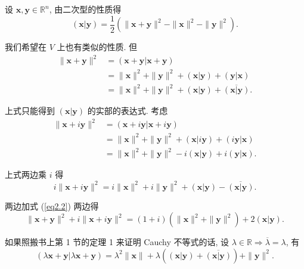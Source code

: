 \documentclass[color=black,device=normal,lang=cn,mode=geye]{elegantnote}
\begin{document}
设 $\boldsymbol{x},\boldsymbol{y}\in\mathbb{R}^n$, 由二次型的性质得
\[(\boldsymbol{x}|\boldsymbol{y})=\dfrac{1}{2}(\|\boldsymbol{x}+\boldsymbol{y}\|^2-\|\boldsymbol{x}\|^2-\|\boldsymbol{y}\|^2).\]

我们希望在 $V$ 上也有类似的性质. 但
\begin{equation}\label{eq2.2}
    \begin{aligned}
        \|\boldsymbol{x}+\boldsymbol{y}\|^2 & =(\boldsymbol{x}+\boldsymbol{y}|\boldsymbol{x}+\boldsymbol{y}) \\
        & =\|\boldsymbol{x}\|^2+\|\boldsymbol{y}\|^2+(\boldsymbol{x}|\boldsymbol{y})+(\boldsymbol{y}|\boldsymbol{x}) \\
        & =\|\boldsymbol{x}\|^2+\|\boldsymbol{y}\|^2+(\boldsymbol{x}|\boldsymbol{y})+\overline{(\boldsymbol{x}|\boldsymbol{y})}. 
    \end{aligned}
\end{equation}

上式只能得到 $(\boldsymbol{x}|\boldsymbol{y})$ 的实部的表达式. 考虑
\begin{align*}
    \|\boldsymbol{x}+i\boldsymbol{y}\|^2 & =(\boldsymbol{x}+i\boldsymbol{y}|\boldsymbol{x}+i\boldsymbol{y}) \\
    & =\|\boldsymbol{x}\|^2+\|\boldsymbol{y}\|^2+(\boldsymbol{x}|i\boldsymbol{y})+(i\boldsymbol{y}|\boldsymbol{x}) \\
    & =\|\boldsymbol{x}\|^2+\|\boldsymbol{y}\|^2-i(\boldsymbol{x}|\boldsymbol{y})+i(\boldsymbol{y}|\boldsymbol{x}).
\end{align*}

上式两边乘 $i$ 得
\[i\|\boldsymbol{x}+i\boldsymbol{y}\|^2=i\|\boldsymbol{x}\|^2+i\|\boldsymbol{y}\|^2+(\boldsymbol{x}|\boldsymbol{y})-\overline{(\boldsymbol{x}|\boldsymbol{y})}.\]

两边加式 (\ref{eq2.2}) 两边得
\begin{equation}\label{eq2.3}
    \|\boldsymbol{x}+\boldsymbol{y}\|^2+i\|\boldsymbol{x}+i\boldsymbol{y}\|^2=(1+i)(\|\boldsymbol{x}\|^2+\|\boldsymbol{y}\|^2)+2(\boldsymbol{x}|\boldsymbol{y}).
\end{equation}

如果照搬书上第 1 节的定理 1 来证明 Cauchy 不等式的话, 设 $\lambda\in\mathbb{R}\Rightarrow\overline{\lambda}=\lambda$, 有
\[(\lambda\boldsymbol{x}+\boldsymbol{y}|\lambda\boldsymbol{x}+\boldsymbol{y})=\lambda^2\|\boldsymbol{x}\|+\lambda((\boldsymbol{x}|\boldsymbol{y})+\overline{(\boldsymbol{x}|\boldsymbol{y})})+\|\boldsymbol{y}\|^2.\]
\end{document}
